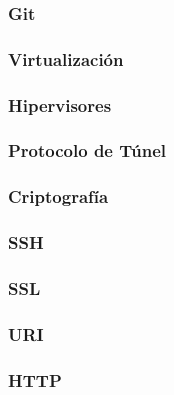 \subsubsection{Git}

\subsubsection{Virtualización}
\subsubsection{Hipervisores}

\subsubsection{Protocolo de Túnel}

\subsubsection{Criptografía}

\subsubsection{SSH}

\subsubsection{SSL}

\subsubsection{URI}

\subsubsection{HTTP}
